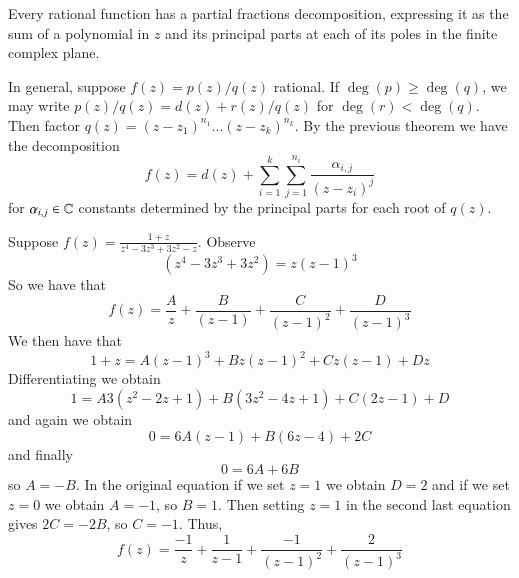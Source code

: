\begin{theorem}
    Every rational function has a partial fractions decomposition, expressing it as the sum of a polynomial in $z$ and its principal parts at each of its poles in the finite complex plane.
\end{theorem}

\begin{remark}
    In general, suppose $f(z) = p(z)/q(z)$ rational. If $\deg(p) \geq \deg(q)$, we may write $p(z)/q(z) = d(z)+r(z)/q(z)$ for $\deg(r) < \deg(q)$. Then factor $q(z) = (z-z_1)^{n_1}...(z-z_k)^{n_k}$. By the previous theorem we have the decomposition \begin{equation*}
        f(z) = d(z) + \sum_{i=1}^k\sum_{j=1}^{n_i}\frac{\alpha_{i,j}}{(z-z_i)^j}
    \end{equation*}
    for $\alpha_{i,j} \in \mathbb C$ constants determined by the principal parts for each root of $q(z)$.
\end{remark}

\begin{example}
    Suppose $f(z) = \frac{1+z}{z^4-3z^3+3z^2-z}$. Observe \begin{equation*}
        (z^4-3z^3+3z^2) = z(z-1)^3
    \end{equation*}
    So we have that \begin{equation*}
        f(z) = \frac{A}{z}+\frac{B}{(z-1)}+\frac{C}{(z-1)^2}+\frac{D}{(z-1)^3}
    \end{equation*}
    We then have that \begin{equation*}
        1+z = A(z-1)^3+Bz(z-1)^2+Cz(z-1)+Dz
    \end{equation*}
    Differentiating we obtain \begin{equation*}
        1 = A3(z^2-2z+1)+B(3z^2-4z+1)+C(2z-1)+D
    \end{equation*}
    and again we obtain \begin{equation*}
        0 = 6A(z-1)+B(6z-4)+2C
    \end{equation*}
    and finally \begin{equation*}
        0 = 6A+6B
    \end{equation*}
    so $A = -B$. In the original equation if we set $z = 1$ we obtain $D = 2$ and if we set $z = 0$ we obtain $A = -1$, so $B = 1$. Then setting $z = 1$ in the second last equation gives $2C = -2B$, so $C = -1$. Thus, \begin{equation*}
        f(z) = \frac{-1}{z}+\frac{1}{z-1}+\frac{-1}{(z-1)^2}+\frac{2}{(z-1)^3}
    \end{equation*}
\end{example}

